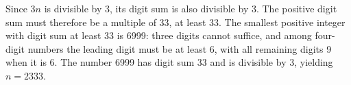 Since $ 3n $ is divisible by 3, its digit sum is also divisible by 3. The positive digit sum must therefore be a multiple of 33, at least 33. The smallest positive integer with digit sum at least 33 is 6999: three digits cannot suffice, and among four-digit numbers the leading digit must be at least 6, with all remaining digits 9 when it is 6. The number 6999 has digit sum 33 and is divisible by 3, yielding $\boxed{n=2333}$.
